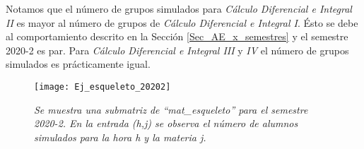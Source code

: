 Notamos que el número de grupos simulados para \textit{Cálculo Diferencial e Integral II} es mayor al número de grupos de \textit{Cálculo Diferencial e Integral I}. Ésto se debe al comportamiento descrito en la Sección \ref{Sec_AE_x_semestres} y el semestre 2020-2 es par. Para \textit{Cálculo Diferencial e Integral III} y \textit{IV} el número de grupos simulados es prácticamente igual.

\begin{figure}[H]
\centering
\texttt{[image: Ej\_esqueleto\_20202]} %
\caption[\textit{Esqueleto simulado para el semestre 2020-2}]{\textit{Se muestra una submatriz de ``mat\_esqueleto'' para el semestre 2020-2. En la entrada (h,j) se observa el número de alumnos simulados para la hora h y la materia j.}}\label{esqueleto20202}
\end{figure}


